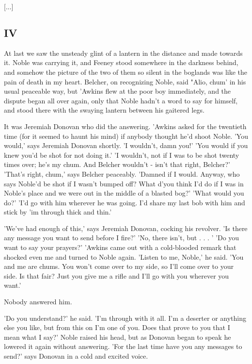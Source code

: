\documentclass[10pt,a4paper]{article}
\begin{document}
[...]

\subsection{IV}

At last we saw the unsteady glint of a lantern in the distance and made towards it. Noble was carrying it, and Feeney stood somewhere in the darkness behind, and somehow the picture of the two of them so silent in the boglands was like the pain of death in my heart. Belcher, on recognizing Noble, said "Alio, chum' in his usual peaceable way, but 'Awkins flew at the poor boy immediately, and the dispute began all over again, only that Noble hadn't a word to say for himself, and stood there with the swaying lantern between his gaitered legs. 

It was Jeremiah Donovan who did the answering. 'Awkins asked for the twentieth time (for it seemed to haunt his mind) if anybody thought he'd shoot Noble. 'You would,' says Jeremiah Donovan shortly. 'I wouldn't, damn you!' 'You would if you knew you'd be shot for not doing it.' 'I wouldn't, not if I was to be shot twenty times over; he's my chum. And Belcher wouldn't - isn't that right, Belcher?' 'That's right, chum,' says Belcher peaceably. 'Damned if I would. Anyway, who says Noble'd be shot if I wasn't bumped off? What d'you think I'd do if I was in Noble's place and we were out in the middle of a blasted bog?' 'What would you do?' 'I'd go with him wherever he was going. I'd share my last bob with him and stick by 'im through thick and thin.'

'We've had enough of this,' says Jeremiah Donovan, cocking his revolver. 'Is there any message you want to send before I fire?' 'No, there isn't, but . . . ' 'Do you want to say your prayers?' 'Awkins came out with a cold-blooded remark that shocked even me and turned to Noble again. 'Listen to me, Noble,' he said. 'You and me are chums. You won't come over to my side, so I'll come over to your side. Is that fair? Just you give me a rifle and I'll go with you wherever you want.' 

Nobody answered him. 

'Do you understand?' he said. 'I'm through with it all. I'm a deserter or anything else you like, but from this on I'm one of you. Does that prove to you that I mean what I say?' Noble raised his head, but as Donovan began to speak he lowered it again without answering. 'For the last time have you any messages to send?' says Donovan in a cold and excited voice. 
\end{document}
